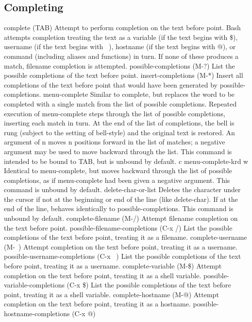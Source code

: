 \subsection{Completing}\label{sec:completing}

complete (TAB)
Attempt to perform completion on the text before point. Bash attempts completion treating the text as a variable (if the text begins with \$), username (if the text begins with ~), hostname (if the text begins with @), or command (including aliases and functions) in turn. If none of these produces a match, filename completion is attempted.
possible-completions (M-?)
List the possible completions of the text before point.
insert-completions (M-*)
Insert all completions of the text before point that would have been generated by possible-completions.
menu-complete
Similar to complete, but replaces the word to be completed with a single match from the list of possible completions. Repeated execution of menu-complete steps through the list of possible completions, inserting each match in turn. At the end of the list of completions, the bell is rung (subject to the setting of bell-style) and the original text is restored. An argument of n moves n positions forward in the list of matches; a negative argument may be used to move backward through the list. This command is intended to be bound to TAB, but is unbound by default.
c menu-complete-krd w
Identical to menu-complete, but moves backward through the list of possible completions, as if menu-complete had been given a negative argument. This command is unbound by default.
delete-char-or-list
Deletes the character under the cursor if not at the beginning or end of the line (like delete-char). If at the end of the line, behaves identically to possible-completions. This command is unbound by default.
complete-filename (M-/)
Attempt filename completion on the text before point.
possible-filename-completions (C-x /)
List the possible completions of the text before point, treating it as a filename.
complete-username (M-~)
Attempt completion on the text before point, treating it as a username.
possible-username-completions (C-x ~)
List the possible completions of the text before point, treating it as a username.
complete-variable (M-\$)
Attempt completion on the text before point, treating it as a shell variable.
possible-variable-completions (C-x \$)
List the possible completions of the text before point, treating it as a shell variable.
complete-hostname (M-@)
Attempt completion on the text before point, treating it as a hostname.
possible-hostname-completions (C-x @)
